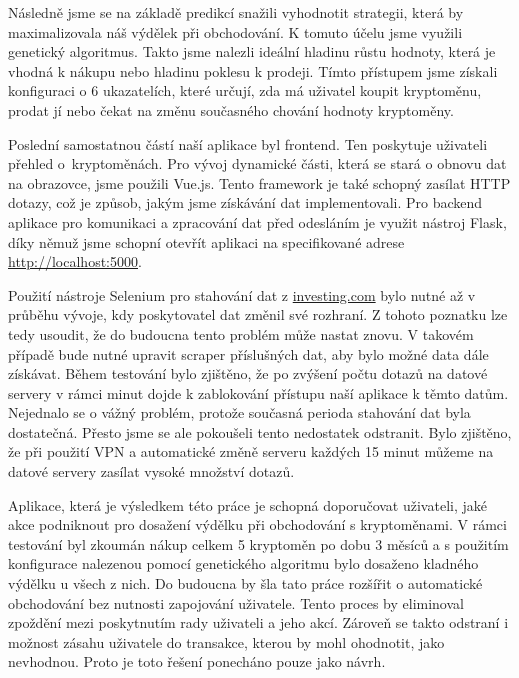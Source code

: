 Následně jsme se na základě predikcí snažili vyhodnotit strategii, která by maximalizovala náš výdělek při obchodování.
K tomuto účelu jsme využili genetický algoritmus.
Takto jsme nalezli ideální hladinu růstu hodnoty, která je vhodná k nákupu nebo hladinu poklesu k prodeji.
Tímto přístupem jsme získali konfiguraci o 6 ukazatelích, které určují, zda má uživatel koupit kryptoměnu, prodat jí nebo čekat na změnu současného chování hodnoty kryptoměny.

Poslední samostatnou částí naší aplikace byl frontend. 
Ten poskytuje uživateli přehled o~kryptoměnách.
Pro vývoj dynamické části, která se stará o obnovu dat na obrazovce, jsme použili Vue.js.
Tento framework je také schopný zasílat HTTP dotazy, což je způsob, jakým jsme získávání dat implementovali.
Pro backend aplikace pro komunikaci a zpracování dat před odesláním je využit nástroj Flask, díky němuž jsme schopní otevřít aplikaci na specifikované adrese \url{http://localhost:5000}.

Použití nástroje Selenium pro stahování dat z \url{investing.com} bylo nutné až v průběhu vývoje, kdy poskytovatel dat změnil své rozhraní. 
Z tohoto poznatku lze tedy usoudit, že do budoucna tento problém může nastat znovu. 
V takovém případě bude nutné upravit scraper příslušných dat, aby bylo možné data dále získávat.
Během testování bylo zjištěno, že po zvýšení počtu dotazů na datové servery v rámci minut dojde k zablokování přístupu naší aplikace k těmto datům.
Nejednalo se o vážný problém, protože současná perioda stahování dat byla dostatečná. 
Přesto jsme se ale pokoušeli tento nedostatek odstranit. 
Bylo zjištěno, že při použití VPN a automatické změně serveru každých 15 minut můžeme na datové servery zasílat vysoké množství dotazů.

Aplikace, která je výsledkem této práce je schopná doporučovat uživateli, jaké akce podniknout pro dosažení výdělku při obchodování s kryptoměnami.
V rámci testování byl zkoumán nákup celkem 5 kryptoměn po dobu 3 měsíců a s použitím konfigurace nalezenou pomocí genetického algoritmu bylo dosaženo kladného výdělku u všech z nich.
Do budoucna by šla tato práce rozšířit o automatické obchodování bez nutnosti zapojování uživatele.
Tento proces by eliminoval zpoždění mezi poskytnutím rady uživateli a jeho akcí.
Zároveň se takto odstraní i možnost zásahu uživatele do transakce, kterou by mohl ohodnotit, jako nevhodnou.
Proto je toto řešení ponecháno pouze jako návrh.